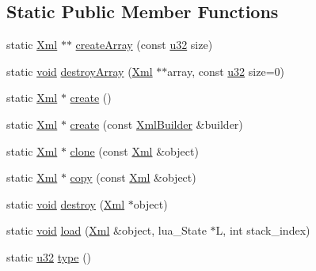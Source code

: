 \subsection*{Static Public Member Functions}
\begin{DoxyCompactItemize}
\item 
static \mbox{\hyperlink{classnjli_1_1_xml}{Xml}} $\ast$$\ast$ \mbox{\hyperlink{classnjli_1_1_xml_a458f6f226b134cee2bd70e3592a0988b}{create\+Array}} (const \mbox{\hyperlink{_util_8h_a10e94b422ef0c20dcdec20d31a1f5049}{u32}} size)
\item 
static \mbox{\hyperlink{_thread_8h_af1e856da2e658414cb2456cb6f7ebc66}{void}} \mbox{\hyperlink{classnjli_1_1_xml_aee3fb8e0b6eb5c7c9d520713d54756c0}{destroy\+Array}} (\mbox{\hyperlink{classnjli_1_1_xml}{Xml}} $\ast$$\ast$array, const \mbox{\hyperlink{_util_8h_a10e94b422ef0c20dcdec20d31a1f5049}{u32}} size=0)
\item 
static \mbox{\hyperlink{classnjli_1_1_xml}{Xml}} $\ast$ \mbox{\hyperlink{classnjli_1_1_xml_a63ccb1a4b1a10e343a5a32786ff57fee}{create}} ()
\item 
static \mbox{\hyperlink{classnjli_1_1_xml}{Xml}} $\ast$ \mbox{\hyperlink{classnjli_1_1_xml_a6c1601d45fcec911477a41f2288d3729}{create}} (const \mbox{\hyperlink{classnjli_1_1_xml_builder}{Xml\+Builder}} \&builder)
\item 
static \mbox{\hyperlink{classnjli_1_1_xml}{Xml}} $\ast$ \mbox{\hyperlink{classnjli_1_1_xml_ac52e78b6e638a84fd79179d4d27371f8}{clone}} (const \mbox{\hyperlink{classnjli_1_1_xml}{Xml}} \&object)
\item 
static \mbox{\hyperlink{classnjli_1_1_xml}{Xml}} $\ast$ \mbox{\hyperlink{classnjli_1_1_xml_adc452dbd5211848fb2c09086d0ba9af3}{copy}} (const \mbox{\hyperlink{classnjli_1_1_xml}{Xml}} \&object)
\item 
static \mbox{\hyperlink{_thread_8h_af1e856da2e658414cb2456cb6f7ebc66}{void}} \mbox{\hyperlink{classnjli_1_1_xml_a1ee896e383ff9e96241ceada752a8324}{destroy}} (\mbox{\hyperlink{classnjli_1_1_xml}{Xml}} $\ast$object)
\item 
static \mbox{\hyperlink{_thread_8h_af1e856da2e658414cb2456cb6f7ebc66}{void}} \mbox{\hyperlink{classnjli_1_1_xml_abb4d1b9b986a184ce29d4d9a00269f27}{load}} (\mbox{\hyperlink{classnjli_1_1_xml}{Xml}} \&object, lua\+\_\+\+State $\ast$L, int stack\+\_\+index)
\item 
static \mbox{\hyperlink{_util_8h_a10e94b422ef0c20dcdec20d31a1f5049}{u32}} \mbox{\hyperlink{classnjli_1_1_xml_ad75f9b9d5bc5bce8a721b9aa550b7bc5}{type}} ()
\end{DoxyCompactItemize}
